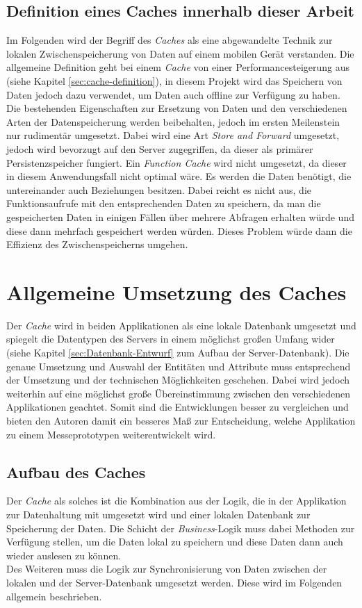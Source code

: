 \subsection{Definition eines Caches innerhalb dieser Arbeit}
\label{ssec:cache-unsere-definition}
Im Folgenden wird der Begriff des \textit{Caches} als eine abgewandelte Technik zur lokalen Zwischenspeicherung von Daten auf einem mobilen Gerät verstanden. Die allgemeine Definition geht bei einem \textit{Cache} von einer Performancesteigerung aus (siehe Kapitel \ref{sec:cache-definition}), in diesem Projekt wird das Speichern von Daten jedoch dazu verwendet, um Daten auch offline zur Verfügung zu haben. Die bestehenden Eigenschaften zur Ersetzung von Daten und den verschiedenen Arten der Datenspeicherung werden beibehalten, jedoch im ersten Meilenstein nur rudimentär umgesetzt. Dabei wird eine Art \textit{Store and Forward} umgesetzt, jedoch wird bevorzugt auf den Server zugegriffen, da dieser als primärer Persistenzspeicher fungiert. Ein \textit{Function Cache} wird nicht umgesetzt, da dieser in diesem Anwendungsfall nicht optimal wäre. Es werden die Daten benötigt, die untereinander auch Beziehungen besitzen. Dabei reicht es nicht aus, die Funktionsaufrufe mit den entsprechenden Daten zu speichern, da man die gespeicherten Daten in einigen Fällen über mehrere Abfragen erhalten würde und diese dann mehrfach gespeichert werden würden. Dieses Problem würde dann die Effizienz des Zwischenspeicherns umgehen.

\section{Allgemeine Umsetzung des Caches}
\label{sec:cache-umsetzung}
Der \textit{Cache} wird in beiden Applikationen als eine lokale Datenbank umgesetzt und spiegelt die Datentypen des Servers in einem möglichst großen Umfang wider (siehe Kapitel \ref{sec:Datenbank-Entwurf} zum Aufbau der Server-Datenbank). Die genaue Umsetzung und Auswahl der Entitäten und Attribute muss entsprechend der Umsetzung und der technischen Möglichkeiten geschehen. Dabei wird jedoch weiterhin auf eine möglichst große Übereinstimmung zwischen den verschiedenen Applikationen geachtet. Somit sind die Entwicklungen besser zu vergleichen und bieten den Autoren damit ein besseres Maß zur Entscheidung, welche Applikation zu einem Messeprototypen weiterentwickelt wird.

\subsection{Aufbau des Caches}
\label{ssec:cache-aufbau}
Der \textit{Cache} als solches ist die Kombination aus der Logik, die in der Applikation zur Datenhaltung mit umgesetzt wird und einer lokalen Datenbank zur Speicherung der Daten. Die Schicht der \textit{Business}-Logik muss dabei Methoden zur Verfügung stellen, um die Daten lokal zu speichern und diese Daten dann auch wieder auslesen zu können.\\
Des Weiteren muss die Logik zur Synchronisierung von Daten zwischen der lokalen und der Server-Datenbank umgesetzt werden. Diese wird im Folgenden allgemein beschrieben.

